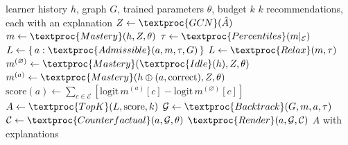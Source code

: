 \begin{algorithm}[t]
\caption{Explained recommendation}
\label{alg:recommend}
\begin{algorithmic}[1]
\Require learner history $h$, graph $G$, trained parameters $\theta$, budget $k$
\Ensure $k$ recommendations, each with an explanation
\State $Z \gets \textproc{GCN}(\hat{A})$ 
\State $m \gets \textproc{Mastery}(h, Z, \theta)$ 
\State $\tau \gets \textproc{Percentiles}(m|_{\mathcal{E}})$ 
\State $L \gets \{\, a : \textproc{Admissible}(a, m, \tau, G) \,\}$ 
  \State $L \gets \textproc{Relax}(m, \tau)$ 
\EndIf
\State $m^{(\varnothing)} \gets \textproc{Mastery}(\textproc{Idle}(h), Z, \theta)$
 
  \State $m^{(a)} \gets \textproc{Mastery}(h \oplus (a, \text{correct}), Z, \theta)$
  \State $\mathrm{score}(a) \gets \sum_{c \in \mathcal{E}} \left[\mathrm{logit}\,m^{(a)}[c] - \mathrm{logit}\,m^{(\varnothing)}[c]\right]$
\EndFor
\State $A \gets \textproc{TopK}(L, \mathrm{score}, k)$
  \State $\mathcal{G} \gets \textproc{Backtrack}(G, m, a, \tau)$ 
  \State $\mathcal{C} \gets \textproc{Counterfactual}(a, \mathcal{G}, \theta)$ 
  \State $\textproc{Render}(a, \mathcal{G}, \mathcal{C})$
\EndFor
\State \Return $A$ with explanations
\end{algorithmic}
\end{algorithm}


%
%
%
%
%
%
